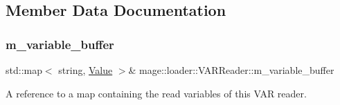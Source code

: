 \subsection{Member Data Documentation}
\mbox{\label{classmage_1_1loader_1_1_v_a_r_reader_a71291d47ea9f9d679bfd7584447ae6bb}} 
\subsubsection{\texorpdfstring{m\+\_\+variable\+\_\+buffer}{m\_variable\_buffer}}
{\footnotesize\ttfamily std\+::map$<$ string, \mbox{\hyperlink{namespacemage_a5bc219b33037a43e23f59e4e8ddff10d}{Value}} $>$\& mage\+::loader\+::\+V\+A\+R\+Reader\+::m\+\_\+variable\+\_\+buffer\hspace{0.3cm}{\ttfamily [private]}}

A reference to a map containing the read variables of this V\+AR reader. 